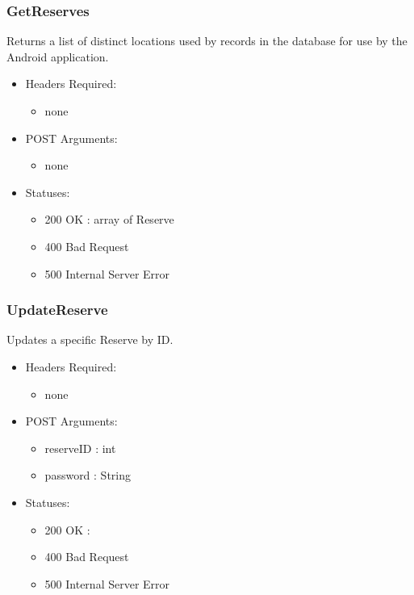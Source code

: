     \subsubsection{GetReserves}
        Returns a list of distinct locations used by records in the database for use by the Android application.
        \begin{itemize}
            \item Headers Required:
            \begin{itemize}
                    \item none
            \end{itemize}
            \item POST Arguments:
            \begin{itemize}
                    \item none
            \end{itemize}
            \item Statuses: 
            \begin{itemize}
                    \item 200 OK : array of Reserve
                    \item 400 Bad Request
                    \item 500 Internal Server Error
            \end{itemize}
        \end{itemize}


    \subsubsection{UpdateReserve}
        Updates a specific Reserve by ID.
        \begin{itemize}
            \item Headers Required:
            \begin{itemize}
                \item none
                \end{itemize}
                \item POST Arguments:
                \begin{itemize}
                        \item reserveID : int
                \item password : String
            \end{itemize}
            \item Statuses: 
            \begin{itemize}
                    \item 200 OK :
                    \item 400 Bad Request
                    \item 500 Internal Server Error
            \end{itemize}
        \end{itemize}


